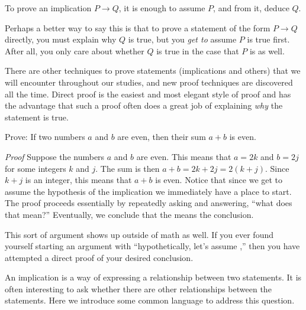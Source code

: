 \documentclass[11pt,]{book}
\makeatletter
\theoremstyle{ptxplainnotitle}
\theoremstyle{ptxplaintitle}
\renewcommand*{\proofname}{Proof}
\renewenvironment{proof}[1][\proofname]{\par
  \pushQED{\qed}%
  \normalfont \topsep6\p@\@plus6\p@\relax
  \trivlist
  \item\relax
    {\itshape
    #1\@addpunct{.}}\hspace\labelsep\ignorespaces
}{%
  \popQED\endtrivlist\@endpefalse
}
\theoremstyle{ptxdefinitionnotitle}
\theoremstyle{ptxdefinitiontitle}
\theoremstyle{ptxdefinitionnotitle}
\theoremstyle{ptxdefinitiontitle}
\theoremstyle{ptxdefinitionnotitle}
\theoremstyle{ptxdefinitiontitle}
\theoremstyle{ptxdefinitiontitlenonumber}
\theoremstyle{ptxdefinitiontitlenonumber}
\numberwithin{equation}{chapter}
\newcommand{\imp}{\rightarrow}
\makeatother
\begin{document}
\begin{assemblage}\label{assemblage-28}
\hypertarget{p-1762}{}%
To prove an implication \(P \imp Q\), it is enough to assume \(P\), and from it, deduce \(Q\).%
\end{assemblage}
\hypertarget{p-1763}{}%
Perhaps a better way to say this is that to prove a statement of the form \(P \imp Q\) directly, you must explain why \(Q\) is true, but you \emph{get to} assume \(P\) is true first.  After all, you only care about whether \(Q\) is true in the case that \(P\) is as well.%
\par
\hypertarget{p-1764}{}%
There are other techniques to prove statements (implications and others) that we will encounter throughout our studies, and new proof techniques are discovered all the time. Direct proof is the easiest and most elegant style of proof and has the advantage that such a proof often does a great job of explaining \emph{why} the statement is true.%
\begin{example}\label{example-50}
\hypertarget{p-1765}{}%
Prove: If two numbers \(a\) and \(b\) are even, then their sum \(a+b\) is even.%
\par\smallskip%
\noindent\textbf{}\hypertarget{solution-217}{}\begin{proof}\hypertarget{proof-20}{}
\hypertarget{p-1766}{}%
Suppose the numbers \(a\) and \(b\) are even. This means that  \(a = 2k\) and \(b=2j\) for some integers \(k\) and \(j\). The sum is then \(a+b = 2k+2j = 2(k+j)\). Since \(k+j\) is an integer, this means that \(a+b\) is even.%
\end{proof}
\hypertarget{p-1767}{}%
Notice that since we get to assume the hypothesis of the implication we immediately have a place to start. The proof proceeds essentially by repeatedly asking and answering, ``what does that mean?''  Eventually, we conclude that the means the conclusion.%
\end{example}
\hypertarget{p-1768}{}%
This sort of argument shows up outside of math as well. If you ever found yourself starting an argument with ``hypothetically, let's assume \textellipsis{},'' then you have attempted a direct proof of your desired conclusion.%
\par
\hypertarget{p-1769}{}%
An implication is a way of expressing a relationship between two statements.  It is often interesting to ask whether there are other relationships between the statements.  Here we introduce some common language to address this question.%
\end{document}

